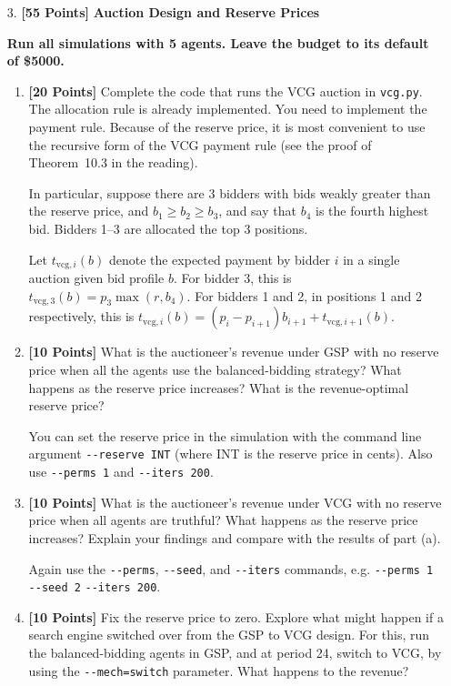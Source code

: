 \documentclass[11pt]{article}
\newcommand{\points}[1]{\textbf{[#1 Points]}}
\begin{document}
\begin{enumerate}
		\item[3.] \points{55} {\bf Auction Design and Reserve Prices}

{\bf Run all simulations with 5 agents. Leave the budget to its default
of \$5000.}

			\begin{enumerate}
\item \points{20} Complete the code that runs
the VCG auction in \verb+vcg.py+. The
allocation rule is already implemented. You need to implement the
payment rule. Because of the reserve price, it is most convenient to
use the recursive form
of the VCG payment rule (see the proof of Theorem~10.3 in the
reading).

In particular, suppose there are 3 bidders with bids weakly greater
than the reserve price, and $b_1\geq b_2\geq b_3$, and say that $b_4$
is the fourth highest bid. Bidders 1--3 are allocated the top 3
positions.

Let $t_{\mathrm{vcg},i}(b)$ denote the expected payment by bidder $i$
in a single auction given bid profile $b$.  For bidder 3, this is
$t_{\mathrm{vcg},3}(b)=p_3 \max(r,b_{4})$. For bidders 1 and 2, in
positions 1 and 2 respectively, this is
$t_{\mathrm{vcg},i}(b)=(p_i-p_{i+1})b_{i+1} +t_{\mathrm{vcg},i+1}(b)$.

				\item \points{10} What is the auctioneer's revenue under GSP with no reserve price when all the agents use the balanced-bidding strategy? What happens as the reserve price increases? What is the revenue-optimal reserve price?

You can set the reserve price in the simulation with the command line argument \verb+--reserve INT+ (where INT is the reserve price in cents). Also use \verb+--perms 1+ and \verb+--iters 200+.
	

				
\item \points{10} What is the auctioneer's revenue under VCG with no
reserve price when all agents are truthful? What happens as the
reserve price increases? Explain your findings and compare with the
results of part (a).

				Again use the \verb+--perms+, \verb+--seed+, and \verb+--iters+ commands, e.g. \verb+--perms 1 --seed 2+ \verb+--iters 200+.
				
				
\item \points{10} Fix the reserve price to zero.
Explore what might happen if a search engine
switched over from the GSP to VCG design.
For this,
run the balanced-bidding agents in
GSP, and at period 24, switch to VCG, by using the \verb+--mech=switch+ parameter. What happens to the revenue?
%


\end{enumerate}
\end{enumerate}
\end{document}
